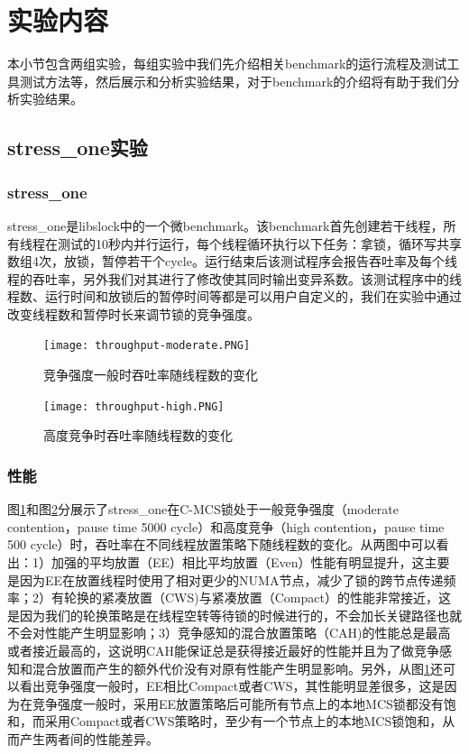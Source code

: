 \section{实验内容}
本小节包含两组实验，每组实验中我们先介绍相关benchmark的运行流程及测试工具测试方法等，然后展示和分析实验结果，对于benchmark的介绍将有助于我们分析实验结果。
\subsection{stress\_one实验}
\subsubsection{stress\_one}
stress\_one是libslock\cite{david2013everything}中的一个微benchmark。该benchmark首先创建若干线程，所有线程在测试的10秒内并行运行，每个线程循环执行以下任务：拿锁，循环写共享数组4次，放锁，暂停若干个cycle。运行结束后该测试程序会报告吞吐率及每个线程的吞吐率，另外我们对其进行了修改使其同时输出变异系数。该测试程序中的线程数、运行时间和放锁后的暂停时间等都是可以用户自定义的，我们在实验中通过改变线程数和暂停时长来调节锁的竞争强度。

\begin{figure}[t]
	\centering
	\texttt{[image: throughput-moderate.PNG]}
	\caption{竞争强度一般时吞吐率随线程数的变化}
	\label{Fig:throughput-moderate}
\end{figure}

\begin{figure}[t]
	\centering
	\texttt{[image: throughput-high.PNG]}
	\caption{高度竞争时吞吐率随线程数的变化}
	\label{Fig:throughput-high}
\end{figure}

\subsubsection{性能}
图\ref{Fig:throughput-moderate}和图\ref{Fig:throughput-high}分展示了stress\_one在C-MCS锁处于一般竞争强度（moderate contention，pause time 5000 cycle）和高度竞争（high contention，pause time 500 cycle）时，吞吐率在不同线程放置策略下随线程数的变化。从两图中可以看出：1）加强的平均放置（EE）相比平均放置（Even）性能有明显提升，这主要是因为EE在放置线程时使用了相对更少的NUMA节点，减少了锁的跨节点传递频率；2）有轮换的紧凑放置（CWS)与紧凑放置（Compact）的性能非常接近，这是因为我们的轮换策略是在线程空转等待锁的时候进行的，不会加长关键路径也就不会对性能产生明显影响；3）竞争感知的混合放置策略（CAH)的性能总是最高或者接近最高的，这说明CAH能保证总是获得接近最好的性能并且为了做竞争感知和混合放置而产生的额外代价没有对原有性能产生明显影响。另外，从图\ref{Fig:throughput-moderate}还可以看出竞争强度一般时，EE相比Compact或者CWS，其性能明显差很多，这是因为在竞争强度一般时，采用EE放置策略后可能所有节点上的本地MCS锁都没有饱和，而采用Compact或者CWS策略时，至少有一个节点上的本地MCS锁饱和，从而产生两者间的性能差异。


